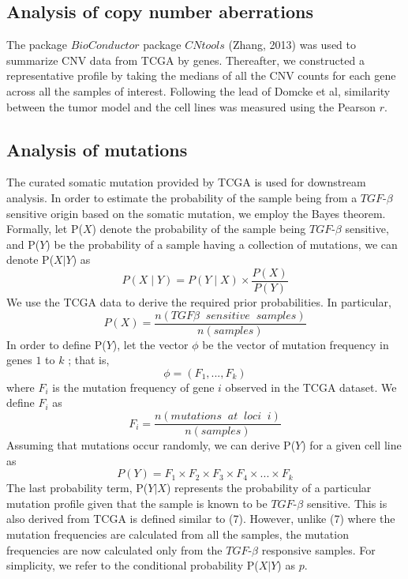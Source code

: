 \documentclass[a4paper,12pt]{article}
\begin{document}
\subsection{Analysis of copy number aberrations}
The package $\textit{BioConductor}$ package $\textit{CNtools}$ (Zhang,
2013) was used to summarize CNV data from TCGA by genes. Thereafter, we
constructed a representative profile by taking the medians of all the
CNV counts for each gene across all the samples of interest. Following
the lead of Domcke et al, similarity between the tumor model and the
cell lines  was measured using the Pearson $\textit{r}$.

\subsection{Analysis of mutations}
The curated somatic mutation provided by TCGA is used for downstream
analysis. In order to estimate the probability of the sample being
from a $\textit{TGF}$-$\beta$ sensitive origin based on the somatic
mutation, we employ the Bayes theorem. Formally, let P($\textit{X}$)
denote the probability of the sample being $\textit{TGF}$-$\beta$
sensitive, and P($\textit{Y}$) be the probability of a sample having a
collection of mutations, we can denote P($\textit{X}$$\mid$$\textit{Y}$) as \begin{equation}
P(\textit{X}\mid \textit{Y}) = P(\textit{Y}\mid\textit{X})\times
\dfrac{P(\textit{X})}{P(\textit{Y})} \end{equation}We use the TCGA data to derive the required prior probabilities. In
particular,
\begin{equation}
P(\textit{X})=\dfrac{n(\textit{TGF}\beta \;\; sensitive\;\; samples)}{n(samples)}
\end{equation}In order to define P($\textit{Y}$), let the vector $\phi$ be
the vector of mutation frequency in genes $\textit{1}$ to $\textit{k}$ ; that
is, \[\phi=(\textit{F}_1, ... , \textit{F}_k) \] where
$\textit{F}$$_i$ is the mutation frequency of gene $\textit{i}$
observed in the TCGA dataset. We define $\textit{F}$$_i$ as \begin{equation}
\textit{F}_i = \dfrac{n(mutations \;\; at\;\; loci \;\; \textit{i})}{n(samples)}
\end{equation}
Assuming that mutations occur randomly, we can derive P($\textit{Y}$)
for a given cell line as \begin{equation} P(\textit{Y}) = \textit{F}_1
\times \textit{F}_2 \times \textit{F}_3 \times
\textit{F}_4 \times ... \times \textit{F}_k\end{equation}
The last probability term, P($\textit{Y}$$\mid$$\textit{X}$)
represents the probability of a particular mutation profile given that
the sample is known to be $\textit{TGF}$-$\beta$ sensitive. This is
also derived from TCGA is defined similar to (7). However,
unlike (7) where the mutation frequencies are calculated from
all the samples, the mutation frequencies are now calculated only from
the $\textit{TGF}$-$\beta$ responsive samples. For simplicity, we refer
to the conditional probability P($\textit{X}$$\mid$$\textit{Y}$) as $\textit{p}$.
\end{document}

